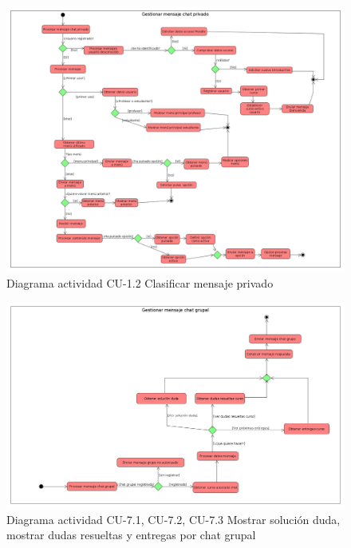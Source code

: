     \begin{figure}[!ht] %
\centering
\includegraphics[scale=0.2]{imagenes/diagramas/actividad/mensaje_chat_privadoo.png}  %

\caption{Diagrama actividad CU-1.2 Clasificar mensaje privado}\label{figura131}
\end{figure}
    

        \begin{figure}[!ht] %
\centering
\includegraphics[scale=0.25]{imagenes/diagramas/actividad/mensaje_chat_grupall.png}  %

\caption{Diagrama actividad CU-7.1, CU-7.2, CU-7.3  Mostrar solución duda, mostrar dudas resueltas y entregas por chat grupal}\label{figura141}
\end{figure}

